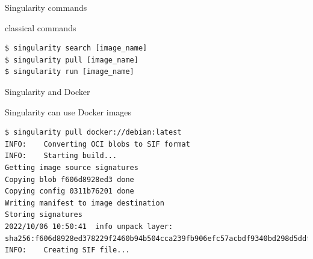 \begin{frame}[<+->][fragile]{Singularity commands}
\begin{block}{classical commands}
\begin{verbatim}
$ singularity search [image_name]
$ singularity pull [image_name]
$ singularity run [image_name]
\end{verbatim}
\end{block}
\end{frame}

\begin{frame}[<+->][fragile]{Singularity and Docker}
\begin{block}{Singularity can use Docker images}
\begin{verbatim}
$ singularity pull docker://debian:latest
INFO:    Converting OCI blobs to SIF format
INFO:    Starting build...
Getting image source signatures
Copying blob f606d8928ed3 done  
Copying config 0311b76201 done  
Writing manifest to image destination
Storing signatures
2022/10/06 10:50:41  info unpack layer: sha256:f606d8928ed378229f2460b94b504cca239fb906efc57acbdf9340bd298d5ddf
INFO:    Creating SIF file...
\end{verbatim}
\end{block}
\end{frame}
